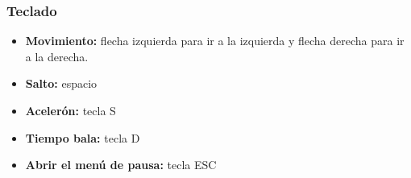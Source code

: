 \subsubsection{Teclado}
\begin{itemize}
\item
\textbf{Movimiento:} flecha izquierda para ir a la izquierda y flecha derecha para ir a la derecha.
\item
\textbf{Salto:} espacio 
\item
\textbf{Acelerón:} tecla S
\item
\textbf{Tiempo bala:} tecla D
\item
\textbf{Abrir el menú de pausa:} tecla ESC
\end{itemize}

